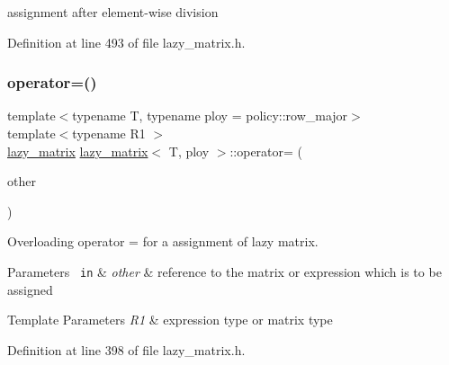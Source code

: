 assignment after element-\/wise division 



Definition at line 493 of file lazy\+\_\+matrix.\+h.

\mbox{\label{classlazy__matrix_ad30f653be1460b38c29fdc124d2b3e79}} 
\subsubsection{\texorpdfstring{operator=()}{operator=()}}
{\footnotesize\ttfamily template$<$typename T, typename ploy = policy\+::row\+\_\+major$>$ \\
template$<$typename R1 $>$ \\
\mbox{\hyperlink{classlazy__matrix}{lazy\+\_\+matrix}} \mbox{\hyperlink{classlazy__matrix}{lazy\+\_\+matrix}}$<$ T, ploy $>$\+::operator= (\begin{DoxyParamCaption}\item[{const R1 \&}]{other }\end{DoxyParamCaption})\hspace{0.3cm}{\ttfamily [inline]}}



Overloading operator = for a assignment of lazy matrix. 


\begin{DoxyParams}[1]{Parameters}
\mbox{\texttt{ in}}  & {\em other} & reference to the matrix or expression which is to be assigned\\
\hline
\end{DoxyParams}

\begin{DoxyTemplParams}{Template Parameters}
{\em R1} & expression type or matrix type \\
\hline
\end{DoxyTemplParams}


Definition at line 398 of file lazy\+\_\+matrix.\+h.

\mbox{\label{classlazy__matrix_aa3ddfb86317cbab26a9c3bb272a2f08f}} 
